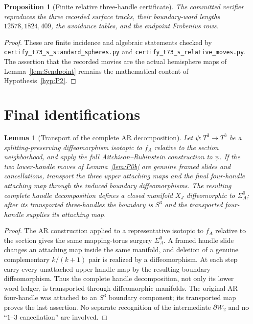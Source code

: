 \documentclass[11pt]{amsart}
\newtheorem{proposition}[theorem]{Proposition}
\newtheorem{lemma}[theorem]{Lemma}
\theoremstyle{definition}
\theoremstyle{remark}
\begin{document}
\begin{proposition}[Finite relative three-handle certificate]\label{thm:Sdischarge}
The committed verifier reproduces the three recorded surface tracks, their
boundary-word lengths $12578,1824,409$, the avoidance tables, and the endpoint
Frobenius rows.
\end{proposition}

\begin{proof}
These are finite incidence and algebraic statements checked by
\texttt{certify\_t73\_s\_standard\_spheres.py} and
\texttt{certify\_t73\_s\_relative\_moves.py}.  The assertion that the recorded
movies are the actual hemisphere maps of Lemma~\ref{lem:Sendpoint} remains the
mathematical content of Hypothesis~\ref{hyp:P2}.
\end{proof}

\section{Final identifications}\label{sec:final-identifications}

\begin{lemma}[Transport of the complete AR decomposition]
\label{lem:upper-handle-transport}
Let $\psi:T^3\to T^3$ be a splitting-preserving diffeomorphism isotopic to
$f_A$ relative to the section neighborhood, and apply the full
Aitchison--Rubinstein construction to $\psi$.  If the two lower-handle moves
of Lemma~\ref{lem:P0b} are genuine framed slides and cancellations, transport
the three upper attaching maps and the final four-handle attaching map through
the induced boundary diffeomorphisms.  The resulting complete handle
decomposition defines a closed manifold $X_J$ diffeomorphic to
$\Sigma_A^0$; after its transported three-handles the boundary is $S^3$ and
the transported four-handle supplies its attaching map.
\end{lemma}

\begin{proof}
The AR construction applied to a representative isotopic to $f_A$ relative
to the section gives the same mapping-torus surgery $\Sigma_A^0$.  A framed
handle slide changes an attaching map inside the same manifold, and deletion
of a genuine complementary $k/(k+1)$ pair is realized by a diffeomorphism.
At each step carry every unattached upper-handle map by the resulting boundary
diffeomorphism.  Thus the complete handle decomposition, not only its lower
word ledger, is transported through diffeomorphic manifolds.  The original AR
four-handle was attached to an $S^3$ boundary component; its transported map
proves the last assertion.  No separate recognition of the intermediate
$\partial W_2$ and no ``$1$--$3$ cancellation'' are involved.
\end{proof}
\end{document}
